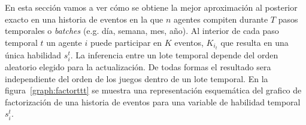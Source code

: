 \documentclass[11pt,twoside,spanish]{report} %
\begin{document}
En esta secci\'on vamos a ver c\'omo se obtiene la mejor aproximaci\'on al posterior exacto en una historia de eventos en la que $n$ agentes compiten durante $T$ pasos temporales o \emph{batches} (e.g. d\'ia, semana, mes, a\~no).
Al interior de cada paso temporal $t$ un agente $i$ puede participar en $K$ eventos, $K_{i_t}$ que resulta en una \'unica habilidad $s_i^t$.
La inferencia entre un lote temporal depende del orden aleatorio elegido para la actualizaci\'on. 
De todas formas el resultado sera independiente del orden de los juegos dentro de un lote temporal.
En la figura~\ref{graph:factorttt} se muestra una representaci\'on esquem\'atica del grafico de factorizaci\'on de una historia de eventos para una variable de habilidad temporal $s_i^t$.


\begin{figure}[H]
\centering
\end{figure}
\end{document}
